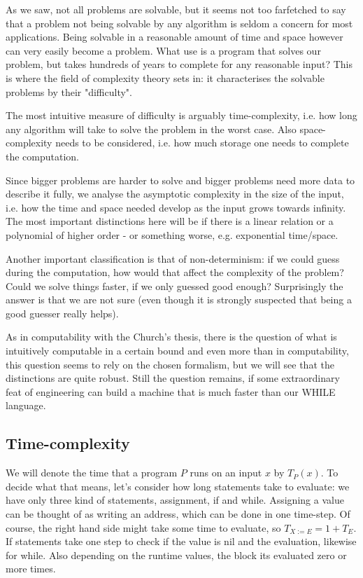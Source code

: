 As we saw, not all problems are solvable, but it seems not too farfetched to
say that a problem not being solvable by any algorithm is seldom a concern for
most applications. Being solvable in a reasonable amount of time and space
however can very easily become a problem. What use is a program that solves our
problem, but takes hundreds of years to complete for any reasonable input? This
is where the field of complexity theory sets in: it characterises the solvable
problems by their "difficulty".

The most intuitive measure of difficulty is arguably time-complexity, i.e. how
long any algorithm will take to solve the problem in the worst case. Also
space-complexity needs to be considered, i.e. how much storage one needs to
complete the computation.

Since bigger problems are harder to solve and bigger problems need more data to
describe it fully, we analyse the asymptotic complexity in the size of the
input, i.e. how the time and space needed develop as the input grows towards
infinity. The most important distinctions here will be if there is a linear
relation or a polynomial of higher order - or something worse, e.g. exponential
time/space.

Another important classification is that of non-determinism: if we could guess
during the computation, how would that affect the complexity of the problem?
Could we solve things faster, if we only guessed good enough? Surprisingly the
answer is that we are not sure (even though it is strongly suspected that being
a good guesser really helps).

As in computability with the Church's thesis, there is the question of what is
intuitively computable in a certain bound and even more than in computability,
this question seems to rely on the chosen formalism, but we will see that the
distinctions are quite robust. Still the question remains, if some
extraordinary feat of engineering can build a machine that is much faster than
our WHILE language.

\subsection{Time-complexity}
We will denote the time that a program $P$ runs on an input $x$ by $T_P(x)$. To
decide what that means, let's consider how long statements take to evaluate: we
have only three kind of statements, assignment, if and while. Assigning a value
can be thought of as writing an address, which can be done in one time-step. Of
course, the right hand side might take some time to evaluate, so $T_{X := E} = 1
+ T_E$. If statements take one step to check if the value is nil and the
evaluation, likewise for while. Also depending on the runtime values, the block
its evaluated zero or more times.

